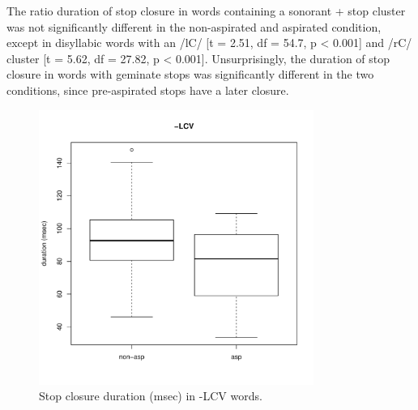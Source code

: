 \documentclass[11pt,a4paper,openany]{memoir}\usepackage[]{graphicx}\usepackage[]{color}
\newenvironment{knitrout}{}{} %
\begin{document}
The ratio duration of stop closure in words containing a sonorant + stop cluster was not significantly different in the non-aspirated and aspirated condition, except in disyllabic words with an /lC/ [t = 2.51, df = 54.7, p < 0.001] and /rC/ cluster [t = 5.62, df = 27.82, p < 0.001].
Unsurprisingly, the duration of stop closure in words with geminate stops was significantly different in the two conditions, since pre-aspirated stops have a later closure.

\begin{figure}
\centering
\begin{knitrout}
\color{fgcolor}
\includegraphics[width=0.8\textwidth]{img/di-lat-clos-box-1} 

\end{knitrout}
\caption{Stop closure duration (msec) in -LCV words.}
\label{f:dilatclos}
\end{figure}
\end{document}
